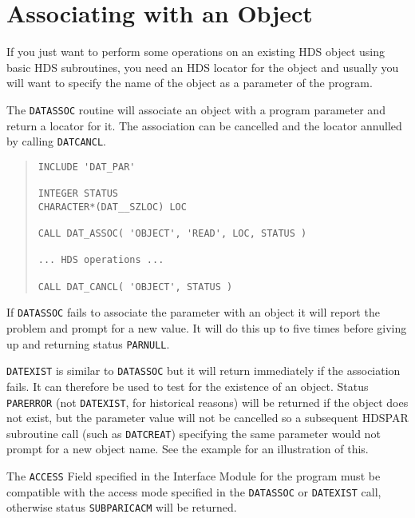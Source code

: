 \documentclass[twoside,11pt]{article}
\newcommand{\htmlref}[2]{#1}
\newcommand{\xref}[3]{#1}
\newcommand{\xlabel}[1]{}
\renewcommand{\_}{\texttt{\symbol{95}}}
\begin{document}
\section{\xlabel{associating_with_an_object}Associating with an Object}
If you just want to perform some operations on an existing 
\xref{HDS object}{sun92}{HDS_objects} 
using basic HDS subroutines, you need an 
\xref{HDS locator}{sun92}{using_locators}
for the object and usually you will want to specify the name of the object as 
a parameter of the program.

The 
\htmlref{\texttt{DAT\_ASSOC}}{DAT_ASSOC}
routine will associate an object with a program parameter and return a locator
for it.
The association can be cancelled and the locator annulled by calling
\htmlref{\texttt{DAT\_CANCL}}{DAT_CANCL}.

\begin{quote} \begin{verbatim}
INCLUDE 'DAT_PAR'

INTEGER STATUS
CHARACTER*(DAT__SZLOC) LOC

CALL DAT_ASSOC( 'OBJECT', 'READ', LOC, STATUS )

... HDS operations ...

CALL DAT_CANCL( 'OBJECT', STATUS )
\end{verbatim} \end{quote}

If \texttt{DAT\_ASSOC} fails to associate the parameter with an object it
will report the problem and prompt for a new value. 
It will do this up to five times before giving up and returning status 
\texttt{PAR\_\_NULL}.

\htmlref{\texttt{DAT\_EXIST}}{DAT_EXIST} is similar to \texttt{DAT\_ASSOC}
but it will return immediately if the association fails. It can therefore be
used to test for the existence of an object. Status \texttt{PAR\_\_ERROR}
(not \texttt{DAT\_EXIST}, for historical reasons) will be returned if the 
object does not exist, but the parameter value will not be cancelled so
a subsequent HDSPAR subroutine call (such as
\htmlref{\texttt{DAT\_CREAT}}{DAT\_CREAT})
specifying the same parameter would not prompt for a new object name.
See
\htmlref{the example}{example} for an
illustration of this.

The 
\xref{\texttt{ACCESS} Field}{sun115}{the_access_field}
specified in the Interface Module for the program must be compatible with
the access mode specified in the 
\texttt{DAT\_ASSOC} or \texttt{DAT\_EXIST} call, otherwise status 
\texttt{SUBPAR\_ICACM} will be returned.
\end{document}
